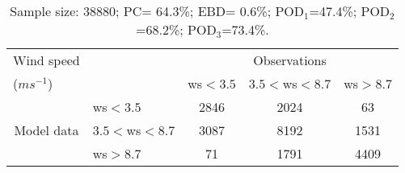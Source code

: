 \documentclass[11pt,english]{article}
\begin{document}
\begin{table}[tbp]
\begin{center}
\begin{tabular}{llccc}
\hline
{Wind speed}                                       &                                                    & \multicolumn{3}{c}{Observations}                 \\
{($m s^{-1}$)}                                       &                             & ws$<3.5$   & $3.5<$ws$<8.7$ & ws$>8.7$ \\
\hline
\multicolumn{1}{c}{\multirow{3}{*}{Model data}}  & ws$<3.5$          & 2846                & 2024                       & 63              \\
                                                 & $3.5<$ws$<8.7$ & 3087                & 8192                       & 1531              \\
                                                 & ws$>8.7$          & 71                & 1791                       & 4409              \\
\hline
\end{tabular}
\end{center}
\caption{Sample size:        38880; PC= 64.3\%; EBD= 0.6\%; POD$_1$=47.4\%; POD$_2$=68.2\%; POD$_3$=73.4\%.}\label{tab:contingency}
\end{table}
\newpage
\end{document}

